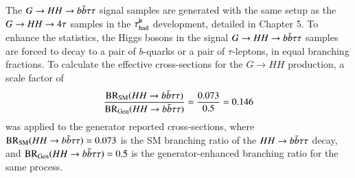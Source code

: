     The $G \rightarrow HH \rightarrow b\bar{b}\tau\tau$ signal samples are generated with the same setup as the $G \rightarrow HH \rightarrow 4\tau$ samples in the $\tau_\mathrm{had}^{\mu\mkern-10mu\backslash}$ development, detailed in Chapter 5.
    To enhance the statistics, the Higgs bosons in the signal $G \rightarrow HH \rightarrow b\bar{b}\tau\tau$ samples are forced to decay to a pair of $b$-quarks or a pair of $\tau$-leptons, in equal branching fractions.
    To calculate the effective cross-sections for the $G\rightarrow HH$ production, a scale factor of 
    $$\frac{\mathrm{BR}_\mathrm{SM}(HH\rightarrow b\bar{b}\tau\tau)}{\mathrm{BR}_\mathrm{Gen}(HH\rightarrow b\bar{b}\tau\tau)} = \frac{0.073}{0.5} = 0.146$$ 
    was applied to the generator reported cross-sections,
    where $\mathrm{BR}_\mathrm{SM}(HH\rightarrow b\bar{b}\tau\tau) = 0.073$ is the SM branching ratio of the $HH\rightarrow b\bar{b}\tau\tau$ decay, 
    and $\mathrm{BR}_\mathrm{Gen}(HH\rightarrow b\bar{b}\tau\tau) = 0.5$ is the generator-enhanced branching ratio for the same process.

